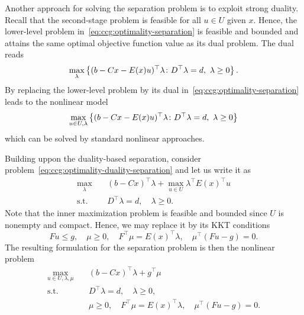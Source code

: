 
Another approach for solving the separation problem is to exploit strong
duality. Recall that the second-stage problem is feasible for all $u\in U$
given $x$. Hence, the lower-level problem
in~\eqref{eq:ccg:optimality-separation} is feasible and bounded and attains
the same optimal objective function value as its dual problem. The dual reads
\begin{equation*}
    \max_{\lambda} \left\{ (b - Cx - E(x)u)^\top\lambda \colon D^\top \lambda = d, \ \lambda \ge 0 \right\}.
\end{equation*}
By replacing the lower-level problem by its dual in~\eqref{eq:ccg:optimality-separation} leads to the nonlinear model
\begin{equation}
    \label{eq:ccg:optimality-duality-separation}
    \max_{u\in U, \lambda} \left\{ (b - Cx - E(x)u)^\top\lambda \colon D^\top \lambda = d, \ \lambda \ge 0 \right\}
\end{equation}
which can be solved by standard nonlinear approaches. 


Building uppon the duality-based separation, consider
problem~\eqref{eq:ccg:optimality-duality-separation} and let us write it as 
\begin{subequations}
    \begin{align*}
        \max_{\lambda} \quad & (b - Cx)^\top\lambda + 
        \max_{u\in U} \lambda^\top E(x)^\top u \\
        \text{s.t.} \quad & D^\top \lambda = d, \quad \lambda \ge 0.
    \end{align*}
\end{subequations}
Note that the inner maximization problem is feasible and bounded since $U$ is
nonempty and compact. Hence, we may replace it by its KKT conditions
\begin{equation*}
    Fu \le g, \quad \mu \ge 0, \quad F^\top\mu = E(x)^\top\lambda, \quad \mu^\top( Fu - g ) = 0.
\end{equation*}
The resulting formulation for the separation problem is then the nonlinear
problem
\begin{subequations}
    \begin{align*}
        \max_{u\in U,\lambda,\mu} \quad & (b - Cx)^\top\lambda + g^\top\mu \\
        \text{s.t.} \quad & D^\top \lambda = d, \quad \lambda \ge 0, \\
        & \mu \ge 0, \quad F^\top\mu = E(x)^\top\lambda, \quad \mu^\top( Fu - g ) = 0.
    \end{align*}
\end{subequations}

